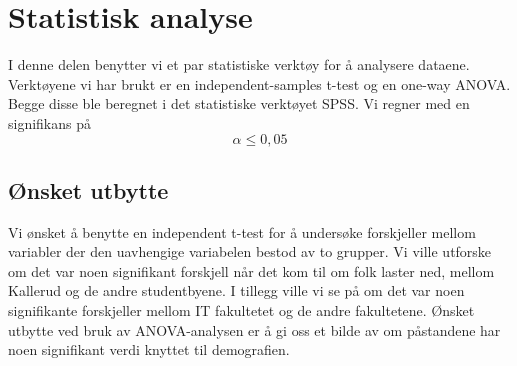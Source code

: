 \section{Statistisk analyse}
I denne delen benytter vi et par statistiske verktøy for å analysere dataene. Verktøyene vi har brukt er en independent-samples t-test og en one-way ANOVA. Begge disse ble beregnet i det statistiske verktøyet SPSS. Vi regner med en signifikans på \[\alpha \le 0,05\]


\subsection{Ønsket utbytte}
Vi ønsket å benytte en independent t-test for å undersøke forskjeller mellom variabler der den uavhengige variabelen bestod av to grupper. Vi ville utforske om det var noen signifikant forskjell når det kom til om folk laster ned, mellom Kallerud og de andre studentbyene. I tillegg ville vi se på om det var noen signifikante forskjeller mellom IT fakultetet og de andre fakultetene. Ønsket utbytte ved bruk av ANOVA-analysen er å gi oss et bilde av om påstandene har noen signifikant verdi knyttet til demografien.


